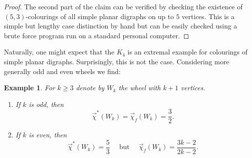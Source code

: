 \documentclass[fontsize=11pt,a4paper,DIV12]{scrartcl}
\theoremstyle{meiner}
\newtheorem{example}{Example}
\theoremstyle{definition}
\begin{document}
\begin{proof}
The second part of the claim can be verified by checking the existence of $(5,3)$-colourings of all simple planar digraphs on up to $5$ vertices. This is a simple but lengthy case distinction by hand but can be easily checked using a brute force program run on a standard personal computer.
\end{proof}
Naturally, one might expect that the $K_4$ is an extremal example for colourings of simple planar digraphs. Surprisingly, this is not the case. Considering more generally odd and even wheels we find:

\pagebreak[3]

\begin{example}
For $k\ge 3$ denote by $W_k$ the wheel with $k+1$ vertices. 
\begin{enumerate}
\item[(A)] If $k$ is odd, then
$$\vec{\chi}^\ast(W_k)=\vec{\chi}_f(W_k)= \frac{3}{2}.$$
\item[(B)] If $k$ is even, then 
$$\vec{\chi}^\ast(W_k) = \frac{5}{3} \quad \text{ but } \quad     
\vec{\chi}_f(W_k)= \frac{3k-2}{2k-2}. $$
\end{enumerate}
\end{example}
\end{document}
